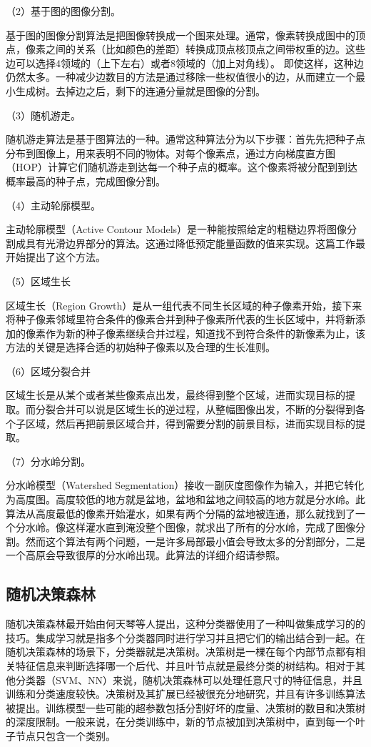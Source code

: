 \documentclass{article}
\begin{document}
（2）基于图的图像分割。

基于图的图像分割算法是把图像转换成一个图来处理。通常，像素转换成图中的顶点，像素之间的关系（比如颜色的差距）转换成顶点核顶点之间带权重的边。这些边可以选择4领域的（上下左右）或者8领域的（加上对角线）。
即使这样，这种边仍然太多。一种减少边数目的方法是通过移除一些权值很小的边，从而建立一个最小生成树。去掉边之后，剩下的连通分量就是图像的分割。


（3）随机游走。

随机游走算法是基于图算法的一种。通常这种算法分为以下步骤：首先先把种子点分布到图像上，用来表明不同的物体。对每个像素点，通过方向梯度直方图（HOP）计算它们随机游走到达每一个种子点的概率。这个像素将被分配到到达概率最高的种子点，完成图像分割。

（4）主动轮廓模型。

主动轮廓模型（Active Contour Models）是一种能按照给定的粗糙边界将图像分割成具有光滑边界部分的算法。这通过降低预定能量函数的值来实现。这篇工作最开始提出了这个方法\citep{Kass1988}。

（5）区域生长

区域生长（Region Growth）是从一组代表不同生长区域的种子像素开始，接下来将种子像素邻域里符合条件的像素合并到种子像素所代表的生长区域中，并将新添加的像素作为新的种子像素继续合并过程，知道找不到符合条件的新像素为止，该方法的关键是选择合适的初始种子像素以及合理的生长准则。

（6）区域分裂合并

区域生长是从某个或者某些像素点出发，最终得到整个区域，进而实现目标的提取。而分裂合并可以说是区域生长的逆过程，从整幅图像出发，不断的分裂得到各个子区域，然后再把前景区域合并，得到需要分割的前景目标，进而实现目标的提取。

（7）分水岭分割。

分水岭模型（Watershed Segmentation）接收一副灰度图像作为输入，并把它转化为高度图。高度较低的地方就是盆地，盆地和盆地之间较高的地方就是分水岭。此算法从高度最低的像素开始灌水，如果有两个分隔的盆地被连通，那么就找到了一个分水岭。像这样灌水直到淹没整个图像，就求出了所有的分水岭，完成了图像分割。然而这个算法有两个问题，一是许多局部最小值会导致太多的分割部分，二是一个高原会导致很厚的分水岭出现。此算法的详细介绍请参照\citep{10.5555/2372488.2372495}。

\subsection{随机决策森林}
随机决策森林最开始由何天琴等人提出\citep{598994}，这种分类器使用了一种叫做集成学习的的技巧。集成学习就是指多个分类器同时进行学习并且把它们的输出结合到一起。在随机决策森林的场景下，分类器就是决策树。决策树是一棵在每个内部节点都有相关特征信息来判断选择哪一个后代、并且叶节点就是最终分类的树结构。相对于其他分类器（SVM、NN）来说，随机决策森林可以处理任意尺寸的特征信息，并且训练和分类速度较快。决策树及其扩展已经被很充分地研究，并且有许多训练算法被提出。训练模型一些可能的超参数包括分割好坏的度量、决策树的数目和决策树的深度限制。一般来说，在分类训练中，新的节点被加到决策树中，直到每一个叶子节点只包含一个类别。
\end{document}
